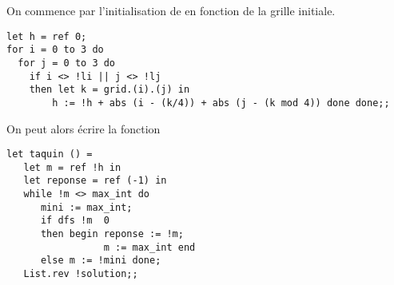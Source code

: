 \begin{Exercise} 
On commence par l'initialisation de  en fonction de la grille initiale.
\begin{lstlisting}
let h = ref 0;
for i = 0 to 3 do
  for j = 0 to 3 do
    if i <> !li || j <> !lj
    then let k = grid.(i).(j) in
        h := !h + abs (i - (k/4)) + abs (j - (k mod 4)) done done;;
\end{lstlisting} 
On peut alors écrire la fonction
\begin{lstlisting}
let taquin () = 
   let m = ref !h in
   let reponse = ref (-1) in
   while !m <> max_int do
      mini := max_int;
      if dfs !m  0
      then begin reponse := !m;
                 m := max_int end
      else m := !mini done;
   List.rev !solution;; 
      
\end{lstlisting}
\end{Exercise}
